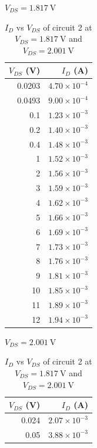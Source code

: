 \documentclass{article}
\begin{document}
\newpage

\begin{table}[H]
  \caption{$I_D$ vs $V_{DS}$ of circuit 2 at $V_{DS} = \SI{1.817}{\volt}$ and $V_{DS} = \SI{2.001}{\volt}$}
  \begin{minipage}[t]{0.5\textwidth}
    \centering
    $V_{DS} = \SI{1.817}{\volt}$\\
    \vspace{1mm}
    \begin{tabular}{rr}
      \toprule
       $V_{DS}$ (V)&$I_D$ (A)\\
      \midrule
      0.0203 & $4.70\times10^{-4}$ \\
      0.0493 & $9.00\times10^{-4}$ \\
      0.1    & $1.23\times10^{-3}$ \\
      0.2    & $1.40\times10^{-3}$ \\
      0.4    & $1.48\times10^{-3}$ \\
      1      & $1.52\times10^{-3}$ \\
      2      & $1.56\times10^{-3}$ \\
      3      & $1.59\times10^{-3}$ \\
      4      & $1.62\times10^{-3}$ \\
      5      & $1.66\times10^{-3}$ \\
      6      & $1.69\times10^{-3}$ \\
      7      & $1.73\times10^{-3}$ \\
      8      & $1.76\times10^{-3}$ \\
      9      & $1.81\times10^{-3}$ \\
      10     & $1.85\times10^{-3}$ \\
      11     & $1.89\times10^{-3}$ \\
      12     & $1.94\times10^{-3}$ \\
    \bottomrule
    \end{tabular}
    \end{minipage}
    \begin{minipage}[t]{0.5\textwidth}
      \centering
      $V_{DS} = \SI{2.001}{\volt}$\\
      \vspace{1mm}
      \begin{tabular}{rr}
        \toprule
         $V_{DS}$ (V)&$I_D$ (A)\\
        \midrule
        0.024 & $2.07\times10^{-3}$ \\
        0.05  & $3.88\times10^{-3}$ \\

\end{tabular}
\end{minipage}
\end{table}
\end{document}
